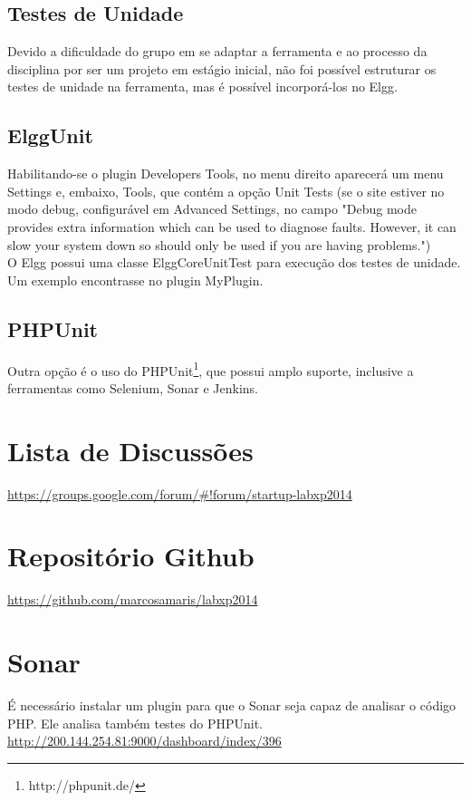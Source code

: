 \documentclass[12pt, letterpaper, onecolumn]{article}
\begin{document}
\subsection{Testes de Unidade}

Devido a dificuldade do grupo em se adaptar a ferramenta e ao processo da disciplina por ser um projeto em estágio inicial, não foi possível estruturar os testes de unidade na ferramenta, mas é possível incorporá-los no Elgg.

\subsection{ElggUnit}

Habilitando-se o plugin Developers Tools, no menu direito aparecerá um menu Settings e, embaixo, Tools, que contém a opção Unit Tests (se o site estiver no modo debug, configurável em Advanced Settings, no campo "Debug mode provides extra information which can be used to diagnose faults. However, it can slow your system down so should only be used if you are having problems.")\\

O Elgg possui uma classe ElggCoreUnitTest para execução dos testes de unidade. Um exemplo encontrasse no plugin MyPlugin.

\subsection{PHPUnit}
Outra opção é o uso do PHPUnit\footnote{http://phpunit.de/}, que possui amplo suporte, inclusive a ferramentas como Selenium, Sonar e Jenkins.



\section{Lista de Discussões}

\url{https://groups.google.com/forum/#!forum/startup-labxp2014}

\section{Repositório Github}

\url{https://github.com/marcosamaris/labxp2014}

\section{Sonar}
É necessário instalar um plugin para que o Sonar seja capaz de analisar o código PHP. Ele analisa também testes do PHPUnit.
\url{http://200.144.254.81:9000/dashboard/index/396}
\end{document}
